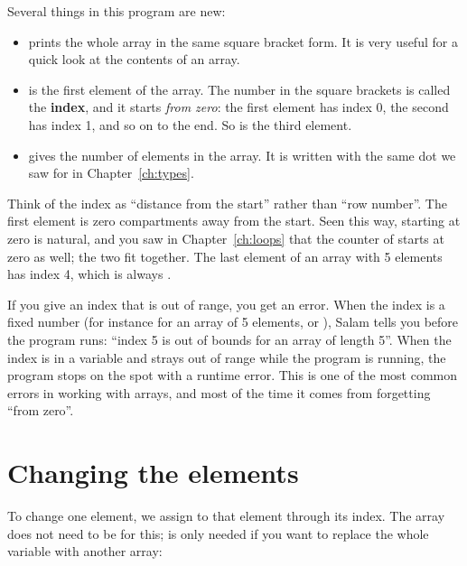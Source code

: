Several things in this program are new:
\begin{itemize}
  \item {} prints the whole array in the same square
        bracket form. It is very useful for a quick look at the contents
        of an array.
  \item {} is the first element of the array. The number in
        the square brackets is called the \textbf{index}, and it starts
        \emph{from zero}: the first element has index 0, the second has
        index 1, and so on to the end. So  is the third
        element.
  \item {} gives the number of elements in the array. It
        is written with the same dot we saw for  in Chapter~\ref{ch:types}.
\end{itemize}

\begin{note}
Think of the index as ``distance from the start'' rather than ``row
number''. The first element is zero compartments away from the start. Seen
this way, starting at zero is natural, and you saw in Chapter~\ref{ch:loops} that the counter of  starts at zero as well;
the two fit together. The last element of an array with 5 elements has
index 4, which is always .
\end{note}

\begin{warn}
If you give an index that is out of range, you get an error. When the index
is a fixed number (for instance  for an array of 5
elements, or ), Salam tells you before the program runs:
``index 5 is out of bounds for an array of length 5''. When the index is in
a variable and strays out of range while the program is running, the program
stops on the spot with a runtime error. This is one of the most common
errors in working with arrays, and most of the time it comes from forgetting
``from zero''.
\end{warn}

\section{Changing the elements}

To change one element, we assign to that element through its index. The
array does not need to be  for this;  is only needed
if you want to replace the whole variable with another array:

